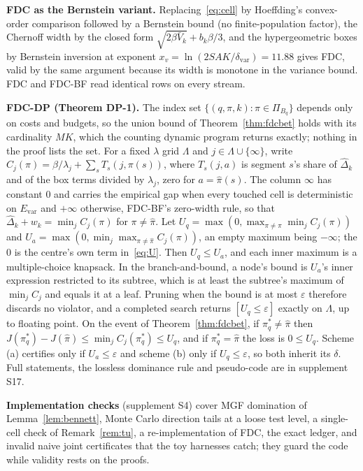 \documentclass[sigconf,anonymous,review]{acmart}
\newcommand{\eps}{\varepsilon}
\newcommand{\dvar}{\delta_{\text{var}}}
\begin{document}
\textbf{FDC as the Bernstein variant.} Replacing~\eqref{eq:cell} by Hoeffding's convex-order comparison followed by a Bernstein bound (no finite-population factor), the Chernoff width by the closed form $\sqrt{2\beta\bar V_k} + b_k\beta/3$, and the hypergeometric boxes by Bernstein inversion at exponent $x_v = \ln(2SAK/\dvar) = 11.88$ gives FDC, valid by the same argument because its width is monotone in the variance bound. FDC and FDC-BF read identical rows on every stream.

\textbf{FDC-DP (Theorem DP-1).} The index set $\{(q, \pi, k) : \pi \in \Pi_{B_q}\}$ depends only on costs and budgets, so the union bound of Theorem~\ref{thm:fdcbet} holds with its cardinality $MK$, which the counting dynamic program returns exactly; nothing in the proof lists the set. For a fixed $\lambda$ grid $\Lambda$ and $j \in \Lambda \cup \{\infty\}$, write $C_j(\pi) = \beta/\lambda_j + \sum_s T_s(j, \pi(s))$, where $T_s(j, a)$ is segment $s$'s share of $\hat\Delta_k$ and of the box terms divided by $\lambda_j$, zero for $a = \hat\pi(s)$. The column $\infty$ has constant 0 and carries the empirical gap when every touched cell is deterministic on $E_{\text{var}}$ and $+\infty$ otherwise, FDC-BF's zero-width rule, so that $\hat\Delta_k + w_k = \min_j C_j(\pi)$ for $\pi \ne \hat\pi$. Let $U_q = \max(0, \max_{\pi \ne \hat\pi} \min_j C_j(\pi))$ and $U_a = \max(0, \min_j \max_{\pi \ne \hat\pi} C_j(\pi))$, an empty maximum being $-\infty$; the 0 is the centre's own term in~\eqref{eq:U}. Then $U_q \le U_a$, and each inner maximum is a multiple-choice knapsack. In the branch-and-bound, a node's bound is $U_a$'s inner expression restricted to its subtree, which is at least the subtree's maximum of $\min_j C_j$ and equals it at a leaf. Pruning when the bound is at most $\eps$ therefore discards no violator, and a completed search returns $[U_q \le \eps]$ exactly on $\Lambda$, up to floating point. On the event of Theorem~\ref{thm:fdcbet}, if $\pi^*_q \ne \hat\pi$ then $J(\pi^*_q) - J(\hat\pi) \le \min_j C_j(\pi^*_q) \le U_q$, and if $\pi^*_q = \hat\pi$ the loss is $0 \le U_q$. Scheme (a) certifies only if $U_a \le \eps$ and scheme (b) only if $U_q \le \eps$, so both inherit its $\delta$. Full statements, the lossless dominance rule and pseudo-code are in supplement S17.

\textbf{Implementation checks} (supplement S4) cover MGF domination of Lemma~\ref{lem:bennett}, Monte Carlo direction tails at a loose test level, a single-cell check of Remark~\ref{rem:tu}, a re-implementation of FDC, the exact ledger, and invalid naive joint certificates that the toy harnesses catch; they guard the code while validity rests on the proofs.
\end{document}
